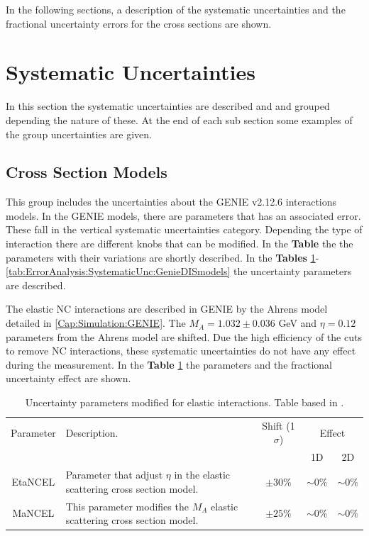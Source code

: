In the following sections, a description of the systematic uncertainties and the fractional uncertainty errors for the cross sections are shown.

\section{Systematic Uncertainties}
\label{Cap:ErrorAnalysis:SystematicUnc}

In this section the systematic uncertainties are described and and grouped depending the nature of these. At the end of each sub section some examples of the group uncertainties are given.

\subsection{Cross Section Models}
\label{Cap:ErrorAnalysis:SystematicUnc:GenieIntMod}
This group includes the uncertainties about the GENIE v2.12.6 interactions models. In the GENIE models, there are parameters that has an associated error. These fall in the vertical systematic uncertainties category. Depending the type of interaction there are different knobs that can be modified. In the \textbf{Table} the the parameters with their variations are shortly described. In the \textbf{Tables} \ref{tab:ErrorAnalysis:SystematicUnc:GenieElastic}-\ref{tab:ErrorAnalysis:SystematicUnc:GenieDISmodels} the uncertainty parameters are described. 

The elastic NC interactions are described in GENIE by the Ahrens model \cite{Ahrens:PhysRevD.35.785} detailed in \ref{Cap:Simulation:GENIE}. The $M_A=1.032\pm0.036$ GeV and $\eta=0.12$ parameters from the Ahrens model are shifted. Due the high efficiency  of the cuts to remove NC interactions, these systematic uncertainties do not have any effect during the measurement. In the \textbf{Table} \ref{tab:ErrorAnalysis:SystematicUnc:GenieElastic} the parameters and the fractional uncertainty effect are shown. 

\begin{table}[!htb]
    \centering
    \begin{tabular}{c|p{2.5in}|c|c|c}
        \hline
        Parameter & Description.  & Shift (1 $\sigma$) & \multicolumn{2}{c}{Effect} \\
         & & & 1D & 2D \\
        \hline 
        EtaNCEL & Parameter that adjust $\eta$ in the elastic scattering  cross section model. & $\pm30\%$ & $\sim0\%$ & $\sim0\%$ \\ \hline
        MaNCEL & This parameter modifies the $M_A$ elastic scattering cross section model. & $\pm25\%$ & $\sim0\%$ & $\sim0\%$ \\ \hline
    \end{tabular}
    \caption{Uncertainty parameters modified for elastic interactions. Table based in \cite{GENIEUnc}.}
    \label{tab:ErrorAnalysis:SystematicUnc:GenieElastic}
\end{table}

